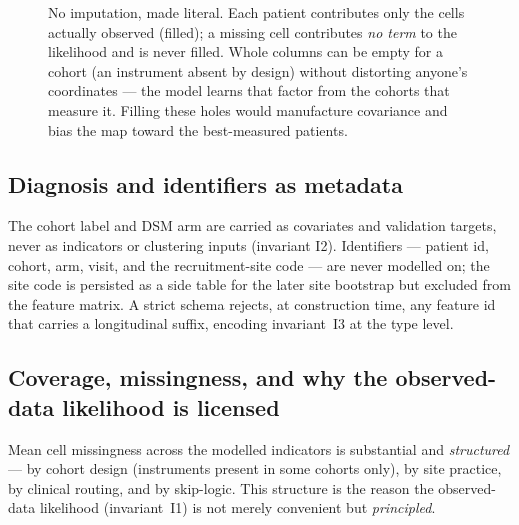 \begin{figure}[h]\centering
\observedcellgrid
\caption{No imputation, made literal. Each patient contributes only the cells actually observed (filled); a
missing cell contributes \emph{no term} to the likelihood and is never filled. Whole columns can be empty for a
cohort (an instrument absent by design) without distorting anyone's coordinates --- the model learns that
factor from the cohorts that measure it. Filling these holes would manufacture covariance and bias the map
toward the best-measured patients.}
\label{fig:observed}
\end{figure}

\subsection{Diagnosis and identifiers as metadata}
The cohort label and DSM arm are carried as covariates and validation targets, never as indicators or clustering
inputs (invariant I2). Identifiers --- patient id, cohort, arm, visit, and the recruitment-site code
 --- are never modelled on; the site code is persisted as a side table for the later site
bootstrap but excluded from the feature matrix. A strict schema rejects, at construction time, any feature id
that carries a longitudinal suffix, encoding invariant~I3 at the type level.

\subsection{Coverage, missingness, and why the observed-data likelihood is licensed}
Mean cell missingness across the modelled indicators is substantial and \emph{structured} --- by cohort design
(instruments present in some cohorts only), by site practice, by clinical routing, and by skip-logic. This
structure is the reason the observed-data likelihood (invariant~I1) is not merely convenient but
\emph{principled}.


